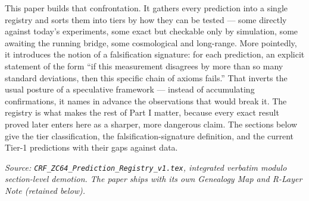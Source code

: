 \documentclass[12pt, a4paper]{article}
\renewcommand{\swsq}{\sin^2\!\theta_W}
\renewcommand{\aEM}{\alpha_{\rm EM}}
\begin{document}
This paper builds that confrontation. It gathers every prediction into a single
registry and sorts them into tiers by how they can be tested --- some directly
against today's experiments, some exact but checkable only by simulation, some
awaiting the running bridge, some cosmological and long-range. More pointedly,
it introduces the notion of a falsification signature: for each prediction, an
explicit statement of the form ``if this measurement disagrees by more than so
many standard deviations, then this specific chain of axioms fails.'' That
inverts the usual posture of a speculative framework --- instead of accumulating
confirmations, it names in advance the observations that would break it. The
registry is what makes the rest of Part I matter, because every exact result
proved later enters here as a sharper, more dangerous claim. The sections below
give the tier classification, the falsification-signature definition, and the
current Tier-1 predictions with their gaps against data.
\label{sec:zc64}

\noindent
\textit{Source: \texttt{CRF\_ZC64\_Prediction\_Registry\_v1.tex}, integrated verbatim modulo
section-level demotion. The paper ships with its own Genealogy Map
and R-Layer Note (retained below).}

\medskip

\begin{abstract}
\noindent
CRF makes quantitative predictions derivable from a single
undefined primitive $\delta$ with zero free parameters.
These predictions are distributed across Parts~A--H of the
Complete Edition and have not previously been consolidated
into a single falsifiability-oriented reference.

ZC64 rectifies this.
\textbf{DEF-ZC64-01} introduces a four-tier classification:
Tier~1 (directly testable against current experiment),
Tier~2 (structurally exact, testable by simulation),
Tier~3 (require R-layer bridge),
Tier~4 (cosmological, long-range).
\textbf{DEF-ZC64-02} defines a \textit{falsification signature}
(FS): a statement of the form ``if measurement $X$ contradicts
CRF prediction $Y$ by $>\!N\sigma$, then axiom chain $Z$ fails.''

The Tier~1 predictions are:
\textbf{PRED-ZC64-01}: $\swsq = 1-\ln8/\ln15 = 0.23213$
(gap $+0.39\%$ vs PDG 2023);
\textbf{PRED-ZC64-02}: $\aEM^{R_0} = (n/15)\GammaCRF$,
giving $1/\alpha^{R_0} = 137.22$ (gap $-0.13\%$ at $R_0$ layer);
\textbf{PRED-ZC64-03}: $H_{\rm emp} = \log_2 15 = 3.9069$~bits
(inherits PRED-Z401, confirmed at $0.15\%$ gap);
\textbf{PRED-ZC64-04}: $e = (1-\Ks)^{-n}$ exactly
(inherits LEM-ZC62-01, structural).

\textbf{FIND-ZC64-01} establishes that all non-structural gaps
(0.39\%, 0.13\%, 0.15\%) share a common origin in
the TLS floor $\eps = 0.00755$ and R-layer crossing costs,
forming a \emph{unified gap structure}.
\textbf{GAP-ZC64-01} registers the R-layer running bridge
(R$_0\!\to\!$R$_{\max}$) as the primary open item for
elevating Tier~3 predictions to Tier~1.
\end{abstract}
\end{document}
